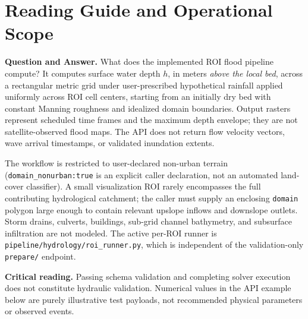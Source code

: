 \documentclass[11pt,a4paper]{article}
\newcommand{\src}[1]{\nolinkurl{#1}}
\newcommand{\warn}[1]{\par\noindent\colorbox{blue!8}{\parbox{.965\linewidth}{\textbf{Critical reading.} #1}}\par}
\begin{document}
\section{Reading Guide and Operational Scope}
\label{sec:alcance}
\begin{center}
\end{center}
\noindent\textbf{Question and Answer.} What does the implemented ROI flood pipeline compute? It computes surface water depth $h$, in meters \emph{above the local bed}, across a rectangular metric grid under user-prescribed hypothetical rainfall applied uniformly across ROI cell centers, starting from an initially dry bed with constant Manning roughness and idealized domain boundaries. Output rasters represent scheduled time frames and the maximum depth envelope; they are not satellite-observed flood maps. The API does not return flow velocity vectors, wave arrival timestamps, or validated inundation extents.

The workflow is restricted to user-declared non-urban terrain (\texttt{domain\_nonurban:true} is an explicit caller declaration, not an automated land-cover classifier). A small visualization ROI rarely encompasses the full contributing hydrological catchment; the caller must supply an enclosing \texttt{domain} polygon large enough to contain relevant upslope inflows and downslope outlets. Storm drains, culverts, buildings, sub-grid channel bathymetry, and subsurface infiltration are not modeled. The active per-ROI runner is \src{pipeline/hydrology/roi_runner.py}, which is independent of the validation-only \texttt{prepare/} endpoint.

\warn{Passing schema validation and completing solver execution does not constitute hydraulic validation. Numerical values in the API example below are purely illustrative test payloads, not recommended physical parameters or observed events.}
\end{document}
